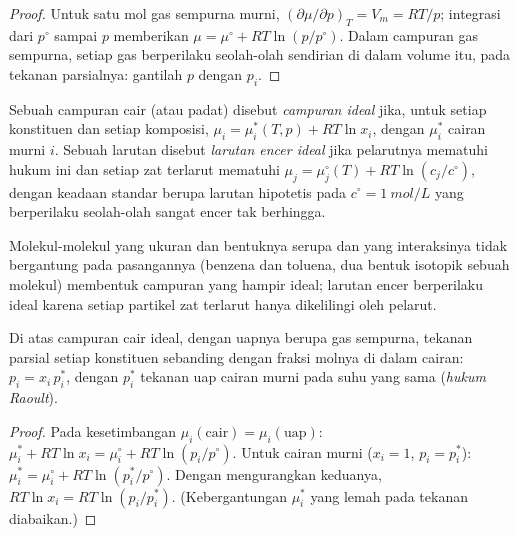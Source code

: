 \begin{proof}
Untuk satu mol gas sempurna murni, $(\partial\mu/\partial p)_T = V_m =
RT/p$; integrasi dari $p^\circ$ sampai $p$ memberikan
$\mu = \mu^\circ + RT\ln(p/p^\circ)$. Dalam campuran gas sempurna, setiap
gas berperilaku seolah-olah sendirian di dalam volume itu, pada tekanan
parsialnya: gantilah $p$ dengan $p_i$.
\end{proof}

\begin{definition}\label{def:b2:chemical-potential:ideal-mixture}
Sebuah campuran cair (atau padat) disebut \emph{campuran
ideal} jika, untuk setiap konstituen dan setiap
komposisi, $\mu_i = \mu_i^*(T, p) + RT\ln x_i$, dengan $\mu_i^*$  cairan murni $i$. Sebuah larutan disebut \emph{larutan encer
ideal} jika pelarutnya mematuhi hukum ini dan
setiap zat terlarut mematuhi $\mu_j = \mu_j^\circ(T) + RT\ln(c_j/c^\circ)$,
dengan keadaan standar berupa larutan hipotetis pada
$c^\circ = \qty{1}{mol/L}$ yang berperilaku seolah-olah sangat encer tak
berhingga.
\end{definition}

Molekul-molekul yang ukuran dan bentuknya serupa dan yang interaksinya
tidak bergantung pada pasangannya (benzena dan toluena, dua bentuk
isotopik sebuah molekul) membentuk campuran yang hampir ideal; larutan
encer berperilaku ideal karena setiap partikel zat terlarut hanya
dikelilingi oleh pelarut.

\begin{theorem}\label{thm:b2:chemical-potential:raoult}
Di atas campuran cair ideal, dengan uapnya berupa gas sempurna, tekanan
parsial setiap konstituen sebanding dengan fraksi molnya di dalam cairan:
$p_i = x_i\,p_i^*$, dengan $p_i^*$ tekanan uap cairan murni pada suhu yang
sama (\emph{hukum Raoult}).
\end{theorem}

\begin{proof}
Pada kesetimbangan $\mu_i(\text{cair}) = \mu_i(\text{uap})$: $\mu_i^* +
RT\ln x_i = \mu_i^\circ + RT\ln(p_i/p^\circ)$. Untuk cairan murni
($x_i = 1$, $p_i = p_i^*$): $\mu_i^* = \mu_i^\circ + RT\ln(p_i^*/p^\circ)$.
Dengan mengurangkan keduanya, $RT\ln x_i = RT\ln(p_i/p_i^*)$.
(Kebergantungan $\mu_i^*$ yang lemah pada tekanan diabaikan.)
\end{proof}

